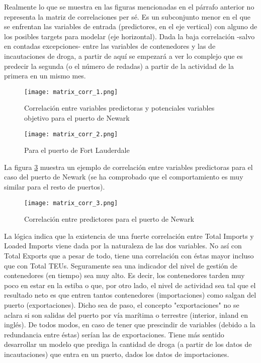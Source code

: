 \documentclass[12pt]{article}
\begin{document}
		Realmente lo que se muestra en las figuras mencionadas en el párrafo anterior no representa la matriz de correlaciones per sé. Es un subconjunto menor en el que se enfrentan las variables de entrada (predictores, en el eje vertical) con alguno de los posibles targets para modelar (eje horizontal). Dada la baja correlación -salvo en contadas excepciones- entre las variables de contenedores y las de incautaciones de droga, a partir de aquí se empezará a ver lo complejo que es predecir la segunda (o el número de redadas) a partir de la actividad de la primera en un mismo mes. 
		
		\begin{figure}[H]
			\caption{\label{matriz_corr_1} Correlación entre variables predictoras y potenciales variables objetivo para el puerto de Newark}
			\centering
			\hspace*{1cm}
			\texttt{[image: matrix\_corr\_1.png]}
		\end{figure}
	
		\begin{figure}[H]
			\caption{\label{matriz_corr_2} Para el puerto de Fort Lauderdale}
			\centering
			\hspace*{1cm}
			\texttt{[image: matrix\_corr\_2.png]}
		\end{figure}
		
		La figura \ref{matriz_corr_3} muestra un ejemplo de correlación entre variables predictoras para el caso del puerto de Newark (se ha comprobado que el comportamiento es muy similar para el resto de puertos).
		
		\begin{figure}[H]
			\caption{\label{matriz_corr_3} Correlación entre predictores para el puerto de Newark}
			\centering
			\hspace*{1cm}
			\texttt{[image: matrix\_corr\_3.png]}
		\end{figure}
	
		La lógica indica que la existencia de una fuerte correlación entre Total Imports y Loaded Imports viene dada por la naturaleza de las dos variables. No así con Total Exports que a pesar de todo, tiene una correlación con éstas mayor incluso que con Total TEUs. Seguramente sea una indicador del nivel de gestión de contenedores (en tiempo) sea muy alto. Es decir, los contenedores tarden muy poco en estar en la estiba o que, por otro lado, el nivel de actividad sea tal que el resultado neto es que entren tantos contenedores (importaciones) como salgan del puerto (exportaciones). Dicho sea de paso, el concepto "exportaciones" no se aclara si son salidas del puerto por vía marítima o terrestre (interior, inland en inglés). De todos modos, en caso de tener que prescindir de variables (debido a la redundancia entre éstas) serían las de exportaciones. Tiene más sentido desarrollar un modelo que prediga la cantidad de droga (a partir de los datos de incautaciones) que entra en un puerto, dados los datos de importaciones.
		
\end{document}
